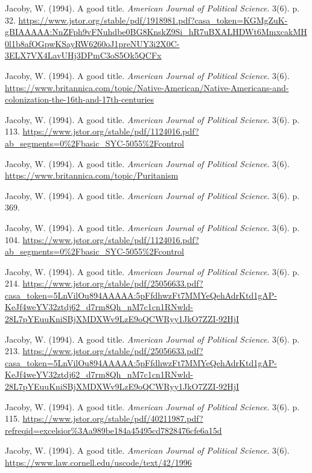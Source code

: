 \documentclass{article}
\begin{document}
\begin{thebibliography}{1}
\raggedright
{}
Jacoby, W. (1994). A good title. \emph{American Journal of Political Science}. 3(6). p. 32. \url{https://www.jstor.org/stable/pdf/1918981.pdf?casa_token=KGMgZuK-gBIAAAAA:NnZFph9vFNuhdbe0BG8KnskZ9Si_hR7uBXALHDWt6MmxcakMH0l1b8afOGpwKSayRW6260oJ1preNUY3i2X0C-3ELX7VX4LavUHj3DPmC3oS5Ok5QCFx}

Jacoby, W. (1994). A good title. \emph{American Journal of Political Science}. 3(6). \url{https://www.britannica.com/topic/Native-American/Native-Americans-and-colonization-the-16th-and-17th-centuries}

Jacoby, W. (1994). A good title. \emph{American Journal of Political Science}. 3(6). p. 113. \url{https://www.jstor.org/stable/pdf/1124016.pdf?ab_segments=0%2Fbasic_SYC-5055%2Fcontrol}

Jacoby, W. (1994). A good title. \emph{American Journal of Political Science}. 3(6). \url{https://www.britannica.com/topic/Puritanism}

Jacoby, W. (1994). A good title. \emph{American Journal of Political Science}. 3(6). p. 369. 

Jacoby, W. (1994). A good title. \emph{American Journal of Political Science}. 3(6). p. 104. \url{https://www.jstor.org/stable/pdf/1124016.pdf?ab_segments=0%2Fbasic_SYC-5055%2Fcontrol}

Jacoby, W. (1994). A good title. \emph{American Journal of Political Science}. 3(6). p. 214. \url{https://www.jstor.org/stable/pdf/25056633.pdf?casa_token=5LnVilOu894AAAAA:5pFfdhwzFt7MMYeQehAdrKtd1gAP-KeJf4weYV32ztdj62_d7rm8Qh_nM7c1cn1RNwld-28L7pYEuuKniSBjXMDXWv9LzE9oQCWRyy1JkO7ZZI-92HjI}

Jacoby, W. (1994). A good title. \emph{American Journal of Political Science}. 3(6). p. 213. \url{https://www.jstor.org/stable/pdf/25056633.pdf?casa_token=5LnVilOu894AAAAA:5pFfdhwzFt7MMYeQehAdrKtd1gAP-KeJf4weYV32ztdj62_d7rm8Qh_nM7c1cn1RNwld-28L7pYEuuKniSBjXMDXWv9LzE9oQCWRyy1JkO7ZZI-92HjI}

Jacoby, W. (1994). A good title. \emph{American Journal of Political Science}. 3(6). p. 115. \url{https://www.jstor.org/stable/pdf/40211987.pdf?refreqid=excelsior%3Aa989be184a45495cd7828476cfe6a15d}

Jacoby, W. (1994). A good title. \emph{American Journal of Political Science}. 3(6). \url{https://www.law.cornell.edu/uscode/text/42/1996}

\end{thebibliography}
\end{document}
